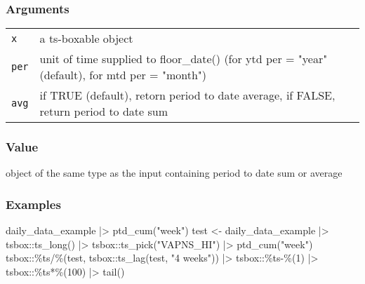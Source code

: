 \documentclass[
  letterpaper,
  DIV=11,
  numbers=noendperiod]{scrreport}
\newenvironment{Shaded}{\begin{snugshade}}{\end{snugshade}}
\newcommand{\AttributeTok}[1]{\textcolor[rgb]{0.40,0.45,0.13}{#1}}
\newcommand{\DecValTok}[1]{\textcolor[rgb]{0.68,0.00,0.00}{#1}}
\newcommand{\FunctionTok}[1]{\textcolor[rgb]{0.28,0.35,0.67}{#1}}
\newcommand{\NormalTok}[1]{\textcolor[rgb]{0.00,0.23,0.31}{#1}}
\newcommand{\OtherTok}[1]{\textcolor[rgb]{0.00,0.23,0.31}{#1}}
\newcommand{\SpecialCharTok}[1]{\textcolor[rgb]{0.37,0.37,0.37}{#1}}
\newcommand{\StringTok}[1]{\textcolor[rgb]{0.13,0.47,0.30}{#1}}
\begin{document}
\subsubsection{Arguments}\label{arguments-43}

\begin{longtable}[]{@{}ll@{}}
\toprule\noalign{}
\endhead
\bottomrule\noalign{}
\endlastfoot
\texttt{x} & a ts-boxable object \\
\texttt{per} & unit of time supplied to floor\_date() (for ytd per =
"year" (default), for mtd per = "month") \\
\texttt{avg} & if TRUE (default), retorn period to date average, if
FALSE, return period to date sum \\
\end{longtable}

\subsubsection{Value}\label{value-43}

object of the same type as the input containing period to date sum or
average

\subsubsection{Examples}\label{examples-43}

\begin{Shaded}
\begin{Highlighting}[]
\NormalTok{daily\_data\_example }\SpecialCharTok{|\textgreater{}}
  \FunctionTok{ptd\_cum}\NormalTok{(}\StringTok{"week"}\NormalTok{)}
\NormalTok{test }\OtherTok{\textless{}{-}}\NormalTok{ daily\_data\_example }\SpecialCharTok{|\textgreater{}}
\NormalTok{  tsbox}\SpecialCharTok{::}\FunctionTok{ts\_long}\NormalTok{() }\SpecialCharTok{|\textgreater{}}
\NormalTok{  tsbox}\SpecialCharTok{::}\FunctionTok{ts\_pick}\NormalTok{(}\StringTok{"VAPNS\_HI"}\NormalTok{) }\SpecialCharTok{|\textgreater{}}
  \FunctionTok{ptd\_cum}\NormalTok{(}\StringTok{"week"}\NormalTok{)}
\NormalTok{tsbox}\SpecialCharTok{::}\StringTok{\textasciigrave{}}\AttributeTok{\%ts/\%}\StringTok{\textasciigrave{}}\NormalTok{(test, tsbox}\SpecialCharTok{::}\FunctionTok{ts\_lag}\NormalTok{(test, }\StringTok{"4 weeks"}\NormalTok{)) }\SpecialCharTok{|\textgreater{}}
\NormalTok{  tsbox}\SpecialCharTok{::}\StringTok{\textasciigrave{}}\AttributeTok{\%ts{-}\%}\StringTok{\textasciigrave{}}\NormalTok{(}\DecValTok{1}\NormalTok{) }\SpecialCharTok{|\textgreater{}}
\NormalTok{  tsbox}\SpecialCharTok{::}\StringTok{\textasciigrave{}}\AttributeTok{\%ts*\%}\StringTok{\textasciigrave{}}\NormalTok{(}\DecValTok{100}\NormalTok{) }\SpecialCharTok{|\textgreater{}}
  \FunctionTok{tail}\NormalTok{()}
\end{Highlighting}
\end{Shaded}
\end{document}
